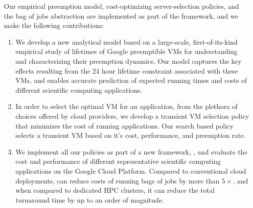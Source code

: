 
Our empirical preemption model, cost-optimizing server-selection policies, and the bag of jobs abstraction are implemented as part of the \sysname framework, and we make the following contributions:
\begin{enumerate}[leftmargin=12pt]
\item We develop a new analytical model based on a large-scale, first-of-its-kind empirical study of lifetimes of Google preemptible VMs for understanding and characterizing their preemption dynamics. Our model captures the key effects resulting from the 24 hour lifetime constraint associated with these VMs, and enables accurate prediction of expected running times and costs of different scientific computing applications.
  
\item In order to select the optimal VM for an application, from the plethora of choices offered by cloud providers, we develop a transient VM selection policy that minimizes the cost of running applications. Our search based policy selects a transient VM based on it's cost, performance, and preemption rate. 



\item We implement all our policies as part of a new framework, \sysname, and evaluate the cost and performance of different representative scientific computing  applications on the Google Cloud Platform. Compared to conventional cloud deployments, \sysname can reduce costs of running bags of jobs by more than $5\times$, and when compared to dedicated HPC clusters, it can reduce the total turnaround time by up to an order of magnitude. 

\end{enumerate}

